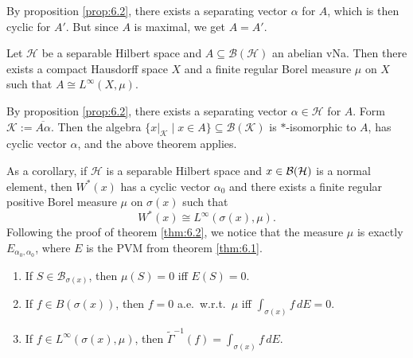 \begin{myproof}
  By proposition \ref{prop:6.2}, there exists a separating vector $\alpha$ for $A$, which is then cyclic for 
  $A'$. But since $A$ is maximal, we get $A = A'$.
\end{myproof}

\begin{theorem}
  Let $\mathcal{H}$ be a separable Hilbert space and $A \subseteq \mathcal{B}(\mathcal{H})$ an abelian 
  vNa. Then there exists a compact Hausdorff space $X$ and a finite regular Borel measure $\mu$ on $X$ such that $A \cong L^\infty(X, \mu)$.
\end{theorem}

\begin{myproof}
  By proposition \ref{prop:6.2}, there exists a separating vector $\alpha \in \mathcal{H}$ for $A$. 
  Form $\mathcal{K} := \overline{A \alpha}$. Then the algebra $\{x\big|_{\mathcal{K}} \mid x \in A\} \subseteq \mathcal{B}(\mathcal{K})$
  is $*$-isomorphic to $A$, has cyclic vector $\alpha$, and the above theorem applies.
\end{myproof}

As a corollary, if $\mathcal{H}$ is a separable Hilbert space and $x \in \operatorname{\mathcal{B} (\mathcal{H})}$ is a normal element, then
$W^* (x)$ has a cyclic vector $\alpha_0$ and
there exists 
a finite regular positive Borel measure $\mu$ on $\sigma(x)$ such that $$W^* (x) \cong L^\infty (\sigma(x), \mu).$$
Following the proof of theorem \ref{thm:6.2}, we notice that the measure $\mu$ is exactly $E_{\alpha_0, \alpha_0}$,
where $E$ is the PVM from theorem \ref{thm:6.1}.

\begin{proposition}
  \begin{enumerate}
    \item If $S \in \mathcal{B}_{\sigma(x)}$, then $\mu (S) = 0$ iff $E(S) = 0$.
    \item If $f \in B(\sigma (x))$, then $f = 0$ a.e.~w.r.t.~$\mu$ iff $\int_{\sigma(x)} f\, dE = 0$.
    \item If $f \in L^\infty (\sigma(x), \mu)$, then $\widetilde{\Gamma}^{-1} (f) = \int_{\sigma(x)} f\, dE$.
  \end{enumerate}
\end{proposition}

